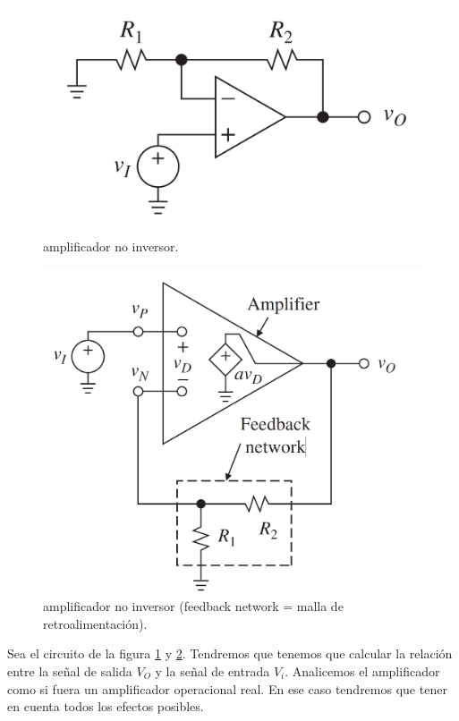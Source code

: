 \documentclass[12pt,a4paper]{article}
\numberwithin{equation}{section}
\numberwithin{figure}{section}
\begin{document}
\begin{figure}[h!] \centering
\includegraphics[scale=0.25]{1.3-Amplificador-inversor.png}
\caption{amplificador no inversor.}
\label{Fig:1.3-Amplificador-inversor}
\end{figure}


\begin{figure}[h!] \centering
\includegraphics[scale=0.3]{1.3-Amplificador-inversor-2.png}
\caption{amplificador no inversor (feedback network = malla de retroalimentación).}
\label{Fig:1.3-Amplificador-inversor-2}
\end{figure}


Sea el circuito de la figura \ref{Fig:1.3-Amplificador-inversor} y \ref{Fig:1.3-Amplificador-inversor-2}. Tendremos que tenemos que calcular la relación entre la señal de salida $V_O$ y la señal de entrada $V_i$. Analicemos el amplificador como si fuera un amplificador operacional real. En ese caso tendremos que tener en cuenta todos los efectos posibles. \\
\end{document}

